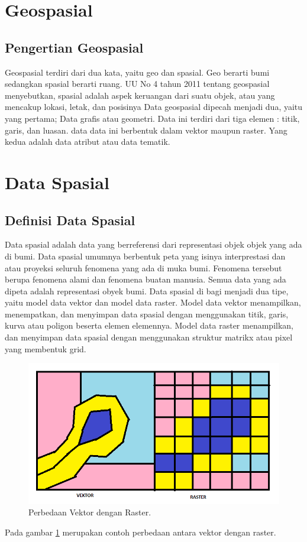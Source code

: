 \section{Geospasial}
\subsection{Pengertian Geospasial}
Geospasial terdiri dari dua kata, yaitu geo dan spasial. Geo berarti bumi sedangkan spasial berarti 
ruang. UU No 4 tahun 2011 tentang geospasial menyebutkan, spasial adalah aspek keruangan dari suatu objek, 
atau yang mencakup lokasi, letak, dan posisinya
Data geospasial dipecah menjadi dua, yaitu yang pertama; Data grafis atau geometri. Data ini terdiri dari
tiga elemen : titik, garis, dan luasan. data data ini berbentuk dalam vektor maupun raster. Yang kedua
adalah data atribut atau data tematik.

\section{Data Spasial}
\subsection{Definisi Data Spasial}
Data spasial adalah data yang berreferensi dari representasi objek objek yang ada di bumi.
Data spasial umumnya berbentuk peta yang isinya interprestasi dan atau proyeksi seluruh 
fenomena yang ada di muka bumi. Fenomena tersebut berupa fenomena alami dan fenomena 
buatan manusia. Semua data yang ada dipeta adalah representasi obyek bumi.
Data spasial di bagi menjadi dua tipe, yaitu model data vektor dan model data raster. 
Model data vektor menampilkan, menempatkan, dan menyimpan data spasial dengan menggunakan 
titik, garis, kurva atau poligon beserta elemen elemennya. Model data raster menampilkan,
dan menyimpan data spasial dengan menggunakan struktur matrikx atau pixel yang membentuk grid.

\begin{figure}[ht]
	\centerline{\includegraphics[width=1\textwidth]{figures/vektorraster.PNG}}
	\caption{Perbedaan Vektor dengan Raster.}
	\label{vektoraster}
	\end{figure}
Pada gambar \ref{vektoraster} merupakan contoh perbedaan antara vektor dengan raster.

